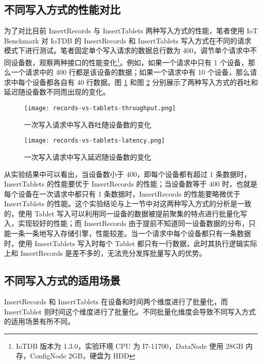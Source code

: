 \subsection{不同写入方式的性能对比\label{sec:chap3-sec1-1}}
为了对比目前 InsertRecords 与 InsertTablets 两种写入方式的性能，笔者使用 IoT Benchmark\cite{liu2019benchmarking} 对 IoTDB 的 InsertRecords 和 InsertTablets 写入方式在不同的请求模式下进行测试。笔者固定单个写入请求的数据总行数为 400，调节单个请求中不同设备数，观察两种接口的性能变化\footnote{IoTDB 版本为 1.3.0，实验环境 CPU 为 I7-11700，DataNode 使用 28GB 内存，ConfigNode 2GB，硬盘为 HDD}。例如，如果一个请求中只有 1 个设备，那么一个请求中的 400 行都是该设备的数据；如果一个请求中有 10 个设备，那么请求中每个设备都各自有 40 行数据。图 \ref{fig:records-vs-tablets-throughput} 和图 \ref{fig:records-vs-tablets-latency} 分别展示了两种写入方式的吞吐和延迟随设备数不同而出现的变化。

\begin{figure}
  \centering 
  \texttt{[image: records-vs-tablets-throughput.png]}
  \caption{一次写入请求中写入吞吐随设备数的变化}
  \label{fig:records-vs-tablets-throughput}
\end{figure}

\begin{figure}
  \centering
  \texttt{[image: records-vs-tablets-latency.png]}
  \caption{一次写入请求中写入延迟随设备数的变化}
  \label{fig:records-vs-tablets-latency}
\end{figure}


从实验结果中可以看出，当设备数小于 400，即每个设备都有超过 1 条数据时，InsertTablets 的性能要优于 InsertRecords 的性能；当设备数等于 400 时，也就是每个设备在一次请求中都只有 1 条数据时，InsertRecords 的性能要略微优于 InsertTablets 的性能。这个实验结论与上一节中对这两种写入方式的分析是一致的，使用 Tablet 写入可以利用同一设备的数据被提前聚集的特点进行批量化写入，实现较好的性能；而 InsertRecords 由于提前不知道同一设备数据的分布，只能一条一条地写入存储引擎，性能较差。当一个请求中每个设备都只有一条数据时，使用 InsertTablets 写入时每个 Tablet 都只有一行数据，此时其执行逻辑实际上和 InsertRecords 是差不多的，无法充分发挥批量写入的优势。


\subsection{不同写入方式的适用场景}
InsertRecords 和 InsertTablets 在设备和时间两个维度进行了批量化，而 InsertTablet 则时间这个维度进行了批量化。不同批量化维度会导致不同写入方式的适用场景有所不同。

